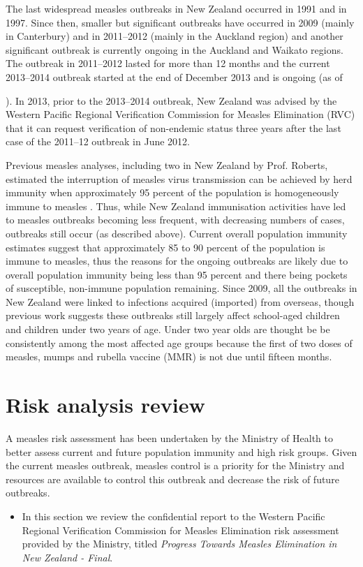 \documentclass{article}
\begin{document}
The last widespread measles outbreaks in New Zealand occurred in 1991 and in 1997. Since then, smaller but significant outbreaks have occurred in 2009 (mainly in Canterbury) and in 2011--2012 (mainly in the Auckland region) and another significant outbreak is currently ongoing in the Auckland and Waikato regions. The outbreak in 2011--2012 lasted for more than 12 months and the current 2013--2014 outbreak started at the end of December 2013 and is ongoing (as of \date{3 July 2014}). In 2013, prior to the 2013--2014 outbreak, New Zealand was advised by the Western Pacific Regional Verification Commission for Measles Elimination (RVC) that it can request verification of non-endemic status three years after the last case of the 2011--12 outbreak in June 2012.

Previous measles analyses, including two in New Zealand by Prof. Roberts, estimated the interruption of measles virus transmission can be achieved by herd immunity when approximately 95 percent of the population is homogeneously immune to measles \citep{roberts0,roberts4}. Thus, while New Zealand immunisation activities have led to measles outbreaks becoming less frequent, with decreasing numbers of cases, outbreaks still occur (as described above). Current overall population immunity estimates suggest that approximately 85 to 90 percent of the population is immune to measles, thus the reasons for the ongoing outbreaks are likely due to overall population immunity being less than 95 percent and there being pockets of susceptible, non-immune population remaining. Since 2009, all the outbreaks in New Zealand were linked to infections acquired (imported) from overseas, though previous work suggests these outbreaks still largely affect school-aged children and children under two years of age. Under two year olds are thought be be consistently among the most affected age groups because the first of two doses of measles, mumps and rubella vaccine (MMR) is not due until fifteen months.

\section{Risk analysis review}

A measles risk assessment has been undertaken by the Ministry of Health to better assess current and future population immunity and high risk groups. Given the current measles outbreak, measles control is a priority for the Ministry and resources are available to control this outbreak and decrease the risk of future outbreaks.
\begin{itemize}
\item In this section we review the confidential report to the Western Pacific Regional Verification Commission for Measles Elimination risk assessment provided by the Ministry, titled \emph {Progress Towards Measles Elimination in New Zealand - Final}.
\end{itemize}
\end{document}
